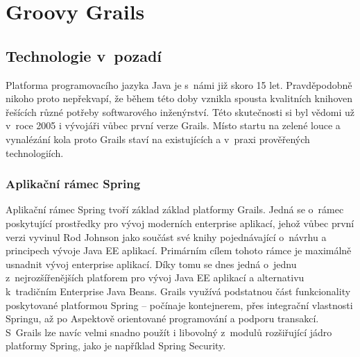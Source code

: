 \chapter{Groovy Grails}

\section{Technologie v~pozadí}
Platforma programovacího jazyka Java je s~námi  již skoro 15 let. Pravděpodobně nikoho proto nepřekvapí, že během této doby vznikla spousta kvalitních knihoven řešících různé potřeby softwarového inženýrství. Této skutečnosti si byl vědomi už v~roce 2005 i vývojáři vůbec první verze Grails. Místo startu na zelené louce a vynalézání kola proto Grails staví na existujících a v~praxi prověřených technologiích.

\subsection{Aplikační rámec Spring}
Aplikační rámec Spring  tvoří základ základ platformy Grails. Jedná se o~rámec poskytující prostředky pro vývoj moderních enterprise aplikací, jehož vůbec první verzi vyvinul Rod Johnson jako součást své knihy  pojednávající o~návrhu a principech vývoje Java EE aplikací. Primárním cílem tohoto rámce je maximálně usnadnit vývoj enterprise aplikací. Díky tomu se dnes jedná o~jednu z~nejrozšířenějších platforem pro vývoj Java EE aplikací a alternativu k~tradičním Enterprise Java Beans. Grails využívá podstatnou část funkcionality poskytované platformou Spring -- počínaje  kontejnerem, přes integrační vlastnosti Springu, až po Aspektově orientované programování a podporu transakcí. S~Grails lze navíc velmi snadno použít i libovolný z~modulů rozšiřující jádro platformy Spring, jako je například Spring Security.


